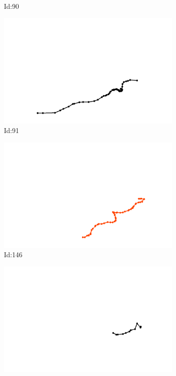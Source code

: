 \documentclass[12pt,twoside]{report}
\begin{document}
\begin{figure}
\begin{subfigure}[b]{0.20\textwidth}
\caption{Id:90}
\end{subfigure}
\begin{subfigure}[b]{0.20\textwidth}
\centering
\includegraphics[width=\textwidth]{../trajectories/91.png}
\caption{Id:91}
\end{subfigure}
\begin{subfigure}[b]{0.20\textwidth}
\centering
\includegraphics[width=\textwidth]{../trajectories/146.png}
\caption{Id:146}
\end{subfigure}
\begin{subfigure}[b]{0.20\textwidth}
\centering
\includegraphics[width=\textwidth]{../trajectories/182.png}

\end{subfigure}
\end{figure}
\end{document}
